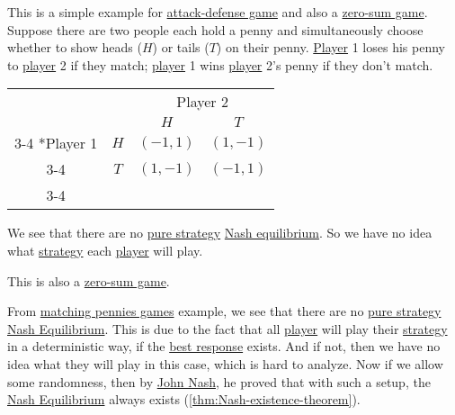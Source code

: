 \begin{eg}\label{eg:matching-pennies}
	This is a simple example for \hyperref[def:attach-defense-game]{attack-defense game} and also a \hyperref[def:zero-sum-game]{zero-sum game}. Suppose there are
	two people each hold a penny and simultaneously choose  whether to show heads (\(H\)) or tails (\(T\)) on their penny. \hyperref[def:player]{Player} 1 loses
	his penny to \hyperref[def:player]{player} 2 if they match; \hyperref[def:player]{player} 1 wins \hyperref[def:player]{player} 2's penny if they don't match.
	\begin{table}[H]
		\centering
		\setlength{\extrarowheight}{2pt}
		\begin{tabular}{cc|c|c|}
			                        & \multicolumn{1}{c}{} & \multicolumn{2}{c}{Player 2}                           \\
			                        & \multicolumn{1}{c}{} & \multicolumn{1}{c}{$H$}      & \multicolumn{1}{c}{$T$} \\\cline{3-4}
			\multirow{2}*{Player 1} & $H$                  & $(-1, 1)$                    & $(1, -1)$               \\\cline{3-4}
			                        & $T$                  & $(1, -1)$                    & $(-1, 1)$               \\\cline{3-4}
		\end{tabular}
	\end{table}
	We see that there are no \hyperref[def:pure-strategy]{pure strategy} \hyperref[def:Nash-equilibrium]{Nash equilibrium}. So we have no idea what
	\hyperref[def:strategy]{strategy} each \hyperref[def:player]{player} will play.
	\begin{remark}
		This is also a \hyperref[def:zero-sum-game]{zero-sum game}.
	\end{remark}
\end{eg}

\begin{remark}
	From \hyperref[eg:matching-pennies]{matching pennies games} example, we see that there are no \hyperref[def:pure-strategy]{pure strategy}
	\hyperref[def:Nash-equilibrium]{Nash Equilibrium}. This is due to
	the fact that all \hyperref[def:player]{player} will play their \hyperref[def:strategy]{strategy} in a deterministic way, if the \hyperref[def:best-response]{best response}
	exists. And if not, then we have no idea what they will play in this case, which is hard to analyze.
	Now if we allow some randomness, then by \href{https://en.wikipedia.org/wiki/John_Forbes_Nash_Jr.}{John Nash}, he proved that with such a setup, the
	\hyperref[def:Nash-equilibrium]{Nash Equilibrium} always exists (\autoref{thm:Nash-existence-theorem}).
\end{remark}


